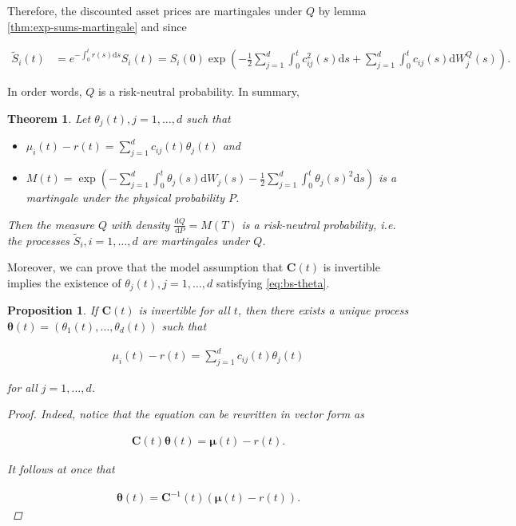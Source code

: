 \documentclass[a4paper]{article}
\newtheorem{proposition}[definition]{Proposition}
\newtheorem{theorem}[definition]{Theorem}
\begin{document}
Therefore, the discounted asset prices are martingales under $Q$ by lemma \eqref{thm:exp-sums-martingale} and since

\begin{align*}
  \tilde{S}_i(t)
  &= e^{-\int_0^t r(s) \mathrm{d}s} S_i(t)
  = S_i(0) \exp \left( - \frac{1}{2} \sum_{j=1}^{d} \int_0^t c_{ij}^2(s) \mathrm{d}s  + \sum_{j=1}^d \int_0^t c_{ij}(s) \mathrm{d}W^Q_j(s) \right).
\end{align*}

In order words, $Q$ is a risk-neutral probability. In summary,

\begin{theorem}
  Let $\theta_j(t), j=1,\ldots,d$ such that

  \begin{itemize}
    \item $\mu_i(t) - r(t) = \sum_{j=1}^d c_{ij}(t) \theta_j(t)$ and
    \item $M(t) = \exp \left( - \sum_{j=1}^d \int_0^t \theta_j(s) \mathrm{d}W_j(s) - \frac{1}{2} \sum_{j=1}^d \int_0^t \theta_j(s)^2 \mathrm{d}s \right)$ is a martingale under the physical probability $P$.
  \end{itemize}

  Then the measure $Q$ with density $\frac{\mathrm{d}Q}{\mathrm{d}P} = M(T)$ is a risk-neutral probability, i.e. the processes $\tilde{S}_i, i=1,\ldots,d$ are martingales under $Q$.
\end{theorem}

Moreover, we can prove that the model assumption that $\mathbf{C}(t)$ is invertible implies the existence of $\theta_j(t), j=1,\ldots,d$ satisfying \eqref{eq:bs-theta}.

\begin{proposition}
  If $\mathbf{C}(t)$ is invertible for all $t$, then there exists a unique process $\mathbf{\theta}(t) = (\theta_1(t), \ldots, \theta_d(t))$ such that

  \begin{align*}
    \mu_i(t) - r(t) = \sum_{j=1}^d c_{ij}(t) \theta_j(t)
  \end{align*}

  for all $j=1,\ldots,d$.

  \begin{proof}
    Indeed, notice that the equation can be rewritten in vector form as

    \begin{align*}
      \mathbf{C}(t) \mathbf{\theta}(t) = \mathbf{\mu}(t) - r(t).
    \end{align*}

    It follows at once that

    \begin{align*}
      \mathbf{\theta}(t) = \mathbf{C}^{-1}(t) (\mathbf{\mu}(t) - r(t)).
    \end{align*}
  \end{proof}
\end{proposition}
\end{document}
